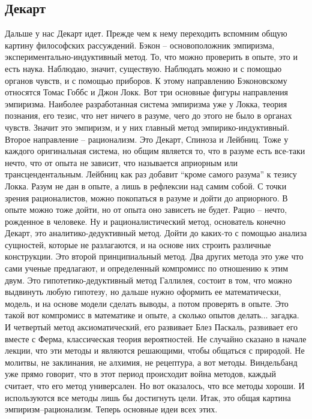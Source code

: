 \documentclass[a4paper, 12pt]{article}
\begin{document}
\subsection{Декарт}
Дальше у нас Декарт идет. Прежде чем к нему переходить вспомним общую 
картину философских рассуждений. Бэкон -- основоположник эмпиризма, 
экспериментально-индуктивный метод. То, что можно проверить в опыте, это 
и есть наука. Наблюдаю, значит, существую. Наблюдать можно и с помощью 
органов чувств, и с помощью приборов. К этому направлению Бэконовскому 
относятся Томас Гоббс и Джон Локк. Вот три основные фигуры направления 
эмпиризма. Наиболее разработанная система эмпиризма уже у Локка, теория 
познания, его тезис, что нет ничего в разуме, чего до этого не было 
в органах чувств. Значит это эмпиризм, и у них главный метод 
эмпирико-индуктивный. Второе направление -- рационализм. Это Декарт, 
Спиноза и Лейбниц. Тоже у каждого оригинальная система, но общим 
является то, что в разуме есть все-таки нечто, что от опыта не зависит, 
что называется априорным или трансцендентальным. Лейбниц как раз добавит 
``кроме самого разума'' к тезису Локка. Разум не дан в опыте, а лишь 
в рефлексии над самим собой. С точки зрения рационалистов, можно 
покопаться в разуме и дойти до априорного. В опыте можно тоже дойти, но 
от опыта оно зависеть не будет. Рацио -- нечто, рожденное в человеке. Ну 
и рационалистический метод, основатель конечно Декарт, это 
аналитико-дедуктивный метод. Дойти до каких-то с помощью анализа 
сущностей, которые не разлагаются, и на основе них строить различные 
конструкции. Это второй принципиальный метод. Два других метода это уже 
что сами ученые предлагают, и определенный компромисс по отношению 
к этим двум. Это гипотетико-дедуктивный метод Галлилея, состоит в том, 
что можно выдвинуть любую гипотезу, но дальше нужно оформить ее 
математически, модель, и на основе модели сделать выводы, а потом 
проверять в опыте. Это такой вот компромисс в математике и опыте, 
а сколько опытов делать... загадка. И четвертый метод аксиоматический, 
его развивает Блез Паскаль, развивает его вместе с Ферма, классическая 
теория вероятностей. Не случайно сказано в начале лекции, что эти методы 
и являются решающими, чтобы общаться с природой. Не молитвы, не 
заклинания, не алхимия, не рецептура, а вот методы. Виндельбанд уже 
прямо говорит, что в этот период происходит война методов, каждый 
считает, что его метод универсален. Но вот оказалось, что все методы 
хороши. И используются все методы лишь бы достигнуть цели. Итак, это 
общая картина эмпиризм--рационализм. Теперь основные идеи всех этих.
\end{document}
